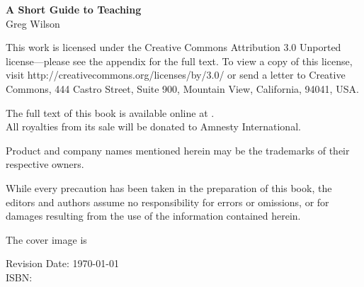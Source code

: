 \newpage

\thispagestyle{empty}

\small
\noindent \textbf{A Short Guide to Teaching} \\
Greg Wilson

\vspace{0.15cm}

\noindent
This work is licensed under the Creative Commons Attribution 3.0
Unported license---please see the appendix for the full text.
To view a copy of this license, visit
http://creativecommons.org/licenses/by/3.0/ or send a letter to Creative
Commons, 444 Castro Street, Suite 900, Mountain View, California,
94041, USA.

\vspace{0.15cm}

\noindent
The full text of this book is available online at .\\
All royalties from its sale will be donated to Amnesty International.\\

\vfill

\noindent
Product and company names mentioned herein may be the trademarks of
their respective owners.\\

\vspace{0.15cm}

\noindent
While every precaution has been taken in the preparation of this
book, the editors and authors assume no responsibility for errors or omissions,
or for damages resulting from the use of the information contained herein.\\

\vspace{0.15cm}

\noindent
The cover image is \\

\vspace{1cm}

\noindent
Revision Date: \today \\

\noindent
ISBN: 

\normalsize

\newpage

\thispagestyle{empty}
\mbox{}    %

\newpage
\tableofcontents
